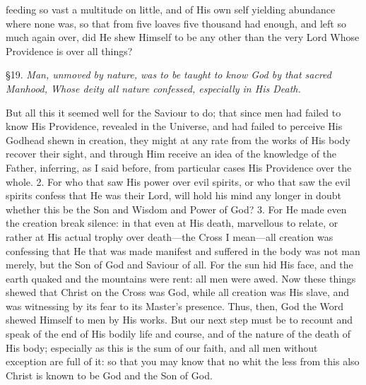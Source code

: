 feeding so vast a multitude on little, and of His own self yielding abundance where none was, so that from five loaves five thousand had enough, and left so much again over, did He shew Himself to be any other than the very Lord Whose Providence is over all things?


§19. \emph{Man, unmoved by nature, was to be taught to know God by that sacred Manhood, Whose deity all nature confessed, especially in His Death.}

But all this it seemed well for the Saviour to do; that since men had failed to know His Providence, revealed in the Universe, and had failed to perceive His Godhead shewn in creation, they might at any rate from the works of His body recover their sight, and through Him receive an idea of the knowledge of the Father, inferring, as I said before, from particular cases His Providence over the whole. 2. For who that saw His power over evil spirits, or who that saw the evil spirits confess that He was their Lord, will hold his mind any longer in doubt whether this be the Son and Wisdom and Power of God? 3. For He made even the creation break silence: in that even at His death, marvellous to relate, or rather at His actual trophy over death—the Cross I mean—all creation was confessing that He that was made manifest and suffered in the body was not man merely, but the Son of God and Saviour of all. For the sun hid His face, and the earth quaked and the mountains were rent: all men were awed. Now these things shewed that Christ on the Cross was God, while all creation was His slave, and was witnessing by its fear to its Master’s presence. Thus, then, God the Word shewed Himself to men by His works. But our next step must be to recount and speak of the end of His bodily life and course, and of the nature of the death of His body; especially as this is the sum of our faith, and all men without exception are full of it: so that you may know that no whit the less from this also Christ is known to be God and the Son of God.


